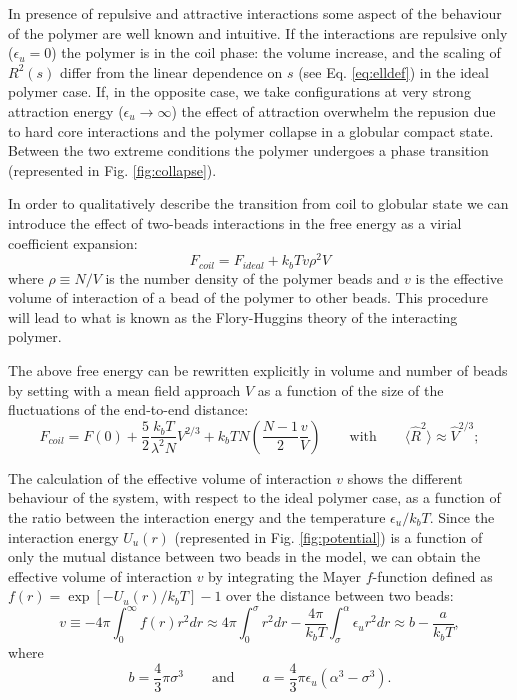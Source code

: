 \documentclass[12pt,a4paper,notitlepage]{article}
\begin{document}
In presence of repulsive and attractive interactions some aspect of
the behaviour of the polymer are well known and intuitive. If the
interactions are repulsive only ($\epsilon_u = 0$) the polymer is in the coil
phase: the volume increase, and the scaling of $R^2(s)$ differ from
the linear dependence on $s$ (see Eq. \ref{eq:elldef}) in the ideal
polymer case. If, in the opposite case, we take configurations at very
strong attraction energy ($\epsilon_u \to \infty$) the effect of attraction
overwhelm the repusion due to hard core interactions and the polymer
collapse in a globular compact state. Between the two extreme
conditions the polymer undergoes a phase transition (represented in
Fig. \ref{fig:collapse}).

In order to qualitatively describe the transition from coil to
globular state we can introduce the effect of two-beads
interactions in the free energy as a virial coefficient expansion:
\begin{equation}
  F_{coil} = F_{ideal} + k_bT v \rho^2 V
\end{equation}
where $\rho \equiv N/V$ is the number density of the polymer
beads and $v$ is the effective volume of interaction of a bead of the
polymer to other beads. This procedure will lead to what is known as
the Flory-Huggins theory of the interacting polymer.

The above free energy can be rewritten explicitly in volume and number
of beads by setting with a mean field approach $V$ as a function of the
size of the fluctuations of the end-to-end distance:
\begin{equation}
  F_{coil} = F(0) + \frac{5}{2} \frac{k_b T}{\lambda^2 N}V^{2/3}
  + k_b T N \left(
  \frac{N - 1}{2} \frac{v}{V} \right) \qquad \mathrm{with} \qquad
    \langle \hat R^2 \rangle \approx \hat V^{2/3};
\label{eq:floryent}
\end{equation}

The calculation of the effective volume of interaction $v$ shows the
different behaviour of the system, with respect to the ideal polymer
case, as a function of the ratio between the interaction energy and the
temperature $\epsilon_u/k_b T$. Since the interaction energy $U_u(r)$
(represented in Fig. \ref{fig:potential}) is a function of only
the mutual distance between two beads in the model, we can obtain the
effective volume of interaction $v$ by integrating the Mayer
$f$-function defined as $f(r) = \exp [-U_u(r)/k_b T] - 1$ over the
distance between two beads:
\begin{equation}
  v \equiv - 4 \pi \int_0^{\infty} f(r) r^2 dr \approx
  4 \pi \int_0^{\sigma}r^2 dr -
  \frac{4 \pi}{k_bT} \int_{\sigma}^{\alpha} \epsilon_u r^2 dr \approx
  b - \frac{a}{k_b T},
\label{eq:effvol1}
\end{equation}
where
\begin{equation}
  b = \frac{4}{3} \pi \sigma^3 \qquad \mathrm{and} \qquad
  a = \frac{4}{3} \pi \epsilon_u (\alpha^3 - \sigma^3).
\label{eq:effvol2}
\end{equation}
\end{document}
